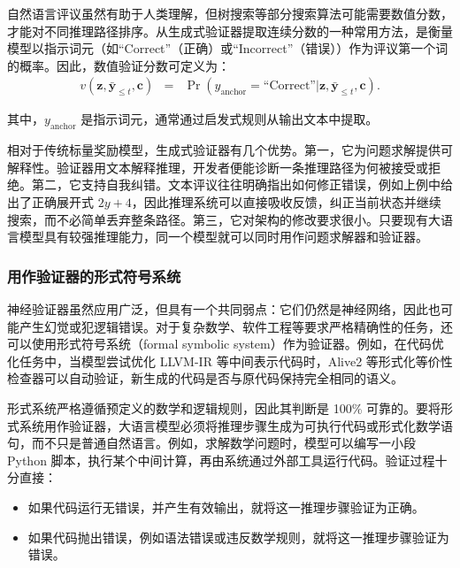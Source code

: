 自然语言评议虽然有助于人类理解，但树搜索等部分搜索算法可能需要数值分数，才能对不同推理路径排序。从生成式验证器提取连续分数的一种常用方法，是衡量模型以指示词元（如“Correct”（正确）或“Incorrect”（错误））作为评议第一个词的概率。因此，数值验证分数可定义为：
\begin{eqnarray}
v(\mathbf{z}, \bar{\mathbf{y}}_{\le t}, \mathbf{c}) & = & \Pr(y_{\mathrm{anchor}} = \text{``Correct''} | \mathbf{z}, \bar{\mathbf{y}}_{\le t}, \mathbf{c}).
\end{eqnarray}

\noindent 其中，$y_{\mathrm{anchor}}$ 是指示词元，通常通过启发式规则从输出文本中提取。

相对于传统标量奖励模型，生成式验证器有几个优势。第一，它为问题求解提供可解释性。验证器用文本解释推理，开发者便能诊断一条推理路径为何被接受或拒绝。第二，它支持自我纠错。文本评议往往明确指出如何修正错误，例如上例中给出了正确展开式 $2y + 4$，因此推理系统可以直接吸收反馈，纠正当前状态并继续搜索，而不必简单丢弃整条路径。第三，它对架构的修改要求很小。只要现有大语言模型具有较强推理能力，同一个模型就可以同时用作问题求解器和验证器。

\subsubsection{用作验证器的形式符号系统}

神经验证器虽然应用广泛，但具有一个共同弱点：它们仍然是神经网络，因此也可能产生幻觉或犯逻辑错误。对于复杂数学、软件工程等要求严格精确性的任务，还可以使用形式符号系统（formal symbolic system）作为验证器。例如，在代码优化任务中，当模型尝试优化 LLVM-IR 等中间表示代码时，Alive2 等形式化等价性检查器可以自动验证，新生成的代码是否与原代码保持完全相同的语义。

形式系统严格遵循预定义的数学和逻辑规则，因此其判断是 100\% 可靠的。要将形式系统用作验证器，大语言模型必须将推理步骤生成为可执行代码或形式化数学语句，而不只是普通自然语言。例如，求解数学问题时，模型可以编写一小段 Python 脚本，执行某个中间计算，再由系统通过外部工具运行代码。验证过程十分直接：

\begin{itemize}
\item \vspace{0.5em} 如果代码运行无错误，并产生有效输出，就将这一推理步骤验证为正确。
\item \vspace{0.3em} 如果代码抛出错误，例如语法错误或违反数学规则，就将这一推理步骤验证为错误。
\end{itemize}
\vspace{0.5em}

